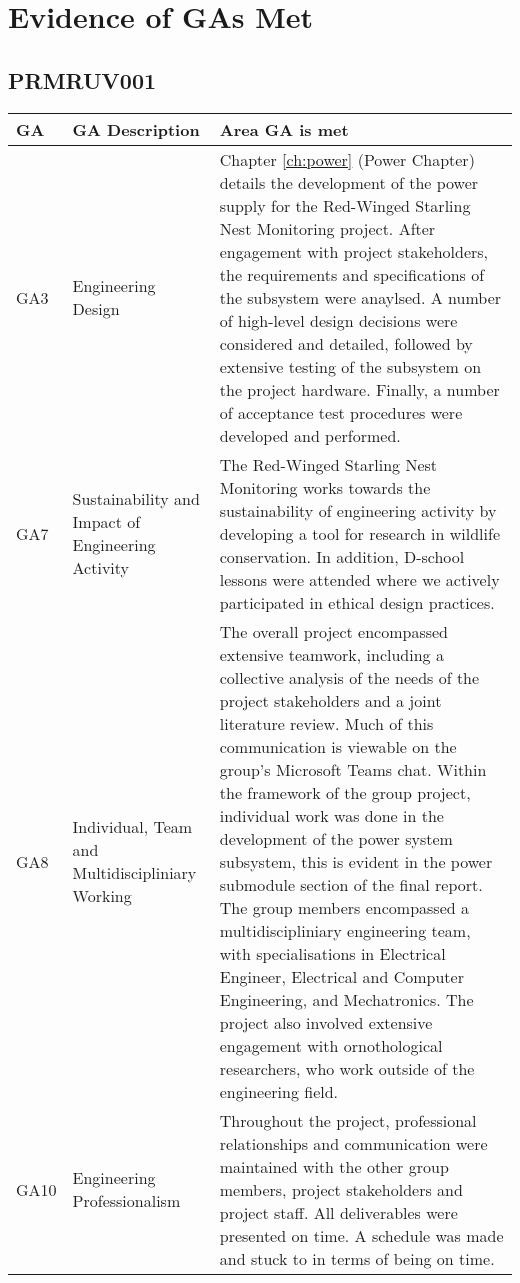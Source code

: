 \documentclass[class=report,11pt,crop=false]{standalone}
\begin{document}
\ifstandalone
\tableofcontents
\fi


\chapter{Evidence of GAs Met}

\section{PRMRUV001}

\centering
\begin{tabularx}{\textwidth}{|p{} p{} X|}

    \hline
    \textbf{GA} & \textbf{GA Description} & \textbf{Area GA is met} \\ \hline

    GA3 & Engineering Design & Chapter \ref{ch:power} (Power Chapter) details the development of the power supply for the Red-Winged Starling Nest Monitoring project. After engagement with project stakeholders, the requirements and specifications of the subsystem were anaylsed. A number of high-level design decisions were considered and detailed, followed by extensive testing of the subsystem on the project hardware. Finally, a number of acceptance test procedures were developed and performed. \\ \hline

    GA7 & Sustainability and Impact of Engineering Activity & The Red-Winged Starling Nest Monitoring works towards the sustainability of engineering activity by developing a tool for research in wildlife conservation. In addition, D-school lessons were attended where we actively participated in ethical design practices. \\ \hline

    GA8 & Individual, Team and Multidiscipliniary Working & The overall project encompassed extensive teamwork, including a collective analysis of the needs of the project stakeholders and a joint literature review. Much of this communication is viewable on the group's Microsoft Teams chat. Within the framework of the group project, individual work was done in the development of the power system subsystem, this is evident in the power submodule section of the final report. The group members encompassed a multidiscipliniary engineering team, with specialisations in Electrical Engineer, Electrical and Computer Engineering, and Mechatronics. The project also involved extensive engagement with ornothological researchers, who work outside of the engineering field. \\ \hline

    GA10 & Engineering Professionalism & Throughout the project, professional relationships and communication were maintained with the other group members, project stakeholders and project staff. All deliverables were presented on time. A schedule was made and stuck to in terms of being on time. \\ \hline


\end{tabularx}
\end{document}
